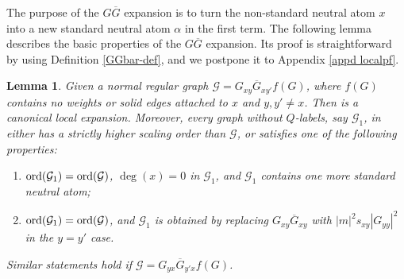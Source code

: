\documentclass{article}
\newcommand{\1}{\mathds{1}}
\numberwithin{equation}{section}
\newcommand{\ord}{{\rm{ord}}}
\newcommand{\al}{\alpha}
\renewcommand{\cal}{\mathcal}
\renewcommand{\geq}{\geqslant}
\renewcommand{\ge}{\geq}
\theoremstyle{plain} %
\newtheorem{lemma}[theorem]{Lemma}
\theoremstyle{remark}
\newcommand{\cor}{\color{red}}
\newcommand{\hty}[1]{{\cor (ht: #1) }}
\begin{document}
The purpose of the $G\overline G$ expansion is to turn the non-standard neutral atom $x$ into a new standard neutral atom $\al$ in the first term. The following lemma describes the basic properties of the $G\overline G$ expansion. Its proof is straightforward by using Definition \ref{GGbar-def}, and we postpone it to Appendix \ref{appd localpf}.  
  \begin{lemma}\label{expandGGbar}
  Given a normal regular graph $\cal G= G_{xy}  \overline G_{xy'} f(G)$, where $f(G)$ contains no weights or solid edges attached to $x$  and $y,y'\ne x$. Then \smash{${\cal O}_{G\overline G}^{(x)}[ \cal G]$} is a canonical local expansion. 
  Moreover, every graph without $Q$-labels, say $\cal G_1$, in \smash{${\cal O}_{G\overline G}^{(x)}[ \cal G]$} either has a strictly higher scaling order than $\cal G$, or satisfies one of the following properties:
% 
\begin{enumerate}
\item[(a)] $\ord(\cal G_1)= \ord(\cal G)$, $\deg(x)=0$ in $\cal G_1$, and $\cal G_1$ contains one more standard neutral atom;
\item[(b)] $\ord(\cal G_1)= \ord(\cal G)$, and $\cal G_1$ is obtained by replacing $G_{xy}  \overline G_{xy}$ with $|m|^2 s_{xy} |G_{y y}|^2$ in the $y=y'$ case. %
\end{enumerate}
Similar statements hold if $\cal G = G_{y x}   \overline  G_{y' x } f(G)$.

  \end{lemma}
 
\end{document}
